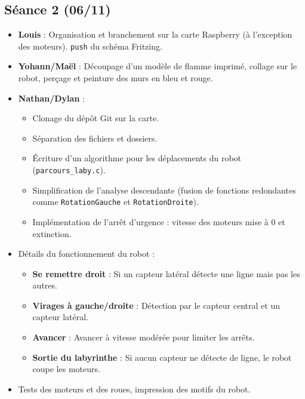 \documentclass[a4paper,12pt]{article}
\begin{document}
\subsection{Séance 2 (06/11)}
\begin{itemize}
    \item \textbf{Louis} : Organisation et branchement sur la carte Raspberry (à l'exception des moteurs). \texttt{push} du schéma Fritzing.
    \item \textbf{Yohann/Maël} : Découpage d'un modèle de flamme imprimé, collage sur le robot, perçage et peinture des murs en bleu et rouge.
    \item \textbf{Nathan/Dylan} : 
    \begin{itemize}
        \item Clonage du dépôt Git sur la carte.
        \item Séparation des fichiers et dossiers.
        \item Écriture d'un algorithme pour les déplacements du robot (\texttt{parcours\_laby.c}).
        \item Simplification de l'analyse descendante (fusion de fonctions redondantes comme \texttt{RotationGauche} et \texttt{RotationDroite}).
        \item Implémentation de l'arrêt d'urgence : vitesse des moteurs mise à 0 et extinction.
    \end{itemize}
    \item Détails du fonctionnement du robot :
    \begin{itemize}
        \item \textbf{Se remettre droit} : Si un capteur latéral détecte une ligne mais pas les autres.
        \item \textbf{Virages à gauche/droite} : Détection par le capteur central et un capteur latéral.
        \item \textbf{Avancer} : Avancer à vitesse modérée pour limiter les arrêts.
        \item \textbf{Sortie du labyrinthe} : Si aucun capteur ne détecte de ligne, le robot coupe les moteurs.
    \end{itemize}
    \item Tests des moteurs et des roues, impression des motifs du robot.
\end{itemize}
\end{document}

